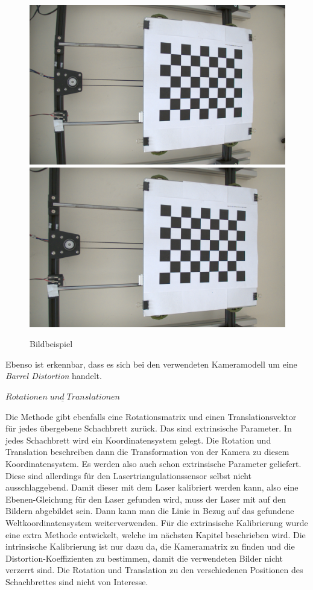 		\begin{figure}[h]
			\centering
			\includegraphics[width=0.49\linewidth]{img/hauptteil/calibration/distorted.png}
			\includegraphics[width=0.49\linewidth]{img/hauptteil/calibration/undistorted.png}
			\caption[Beispiel für die Verzerrung in Bildern]{Bildbeispiel}
			\label{fig:distortion_bsp}
		\end{figure}
	
		Ebenso ist erkennbar, dass es sich bei den verwendeten Kameramodell um eine \textit{Barrel Distortion} handelt.
		
		$\underline{Rotationen \; und \; Translationen}$
		
		Die Methode gibt ebenfalls eine Rotationsmatrix und einen Translationsvektor für jedes übergebene Schachbrett zurück. Das sind extrinsische Parameter. In jedes Schachbrett wird ein Koordinatensystem gelegt. Die Rotation und Translation beschreiben dann die Transformation von der Kamera zu diesem Koordinatensystem. Es werden also auch schon extrinsische Parameter geliefert. Diese sind allerdings für den Lasertriangulationssensor selbst nicht ausschlaggebend. Damit dieser mit dem Laser kalibriert werden kann, also eine Ebenen-Gleichung für den Laser gefunden wird, muss der Laser mit auf den Bildern abgebildet sein. Dann kann man die Linie in Bezug auf das gefundene Weltkoordinatensystem weiterverwenden. Für die extrinsische Kalibrierung wurde eine extra Methode entwickelt, welche im nächsten Kapitel beschrieben wird. \newline
		Die intrinsische Kalibrierung ist nur dazu da, die Kameramatrix zu finden und die Distortion-Koeffizienten zu bestimmen, damit die verwendeten Bilder nicht verzerrt sind. Die Rotation und Translation zu den verschiedenen Positionen des Schachbrettes sind nicht von Interesse. 
			\label{chap:kalibrierung_intrinsisch}
